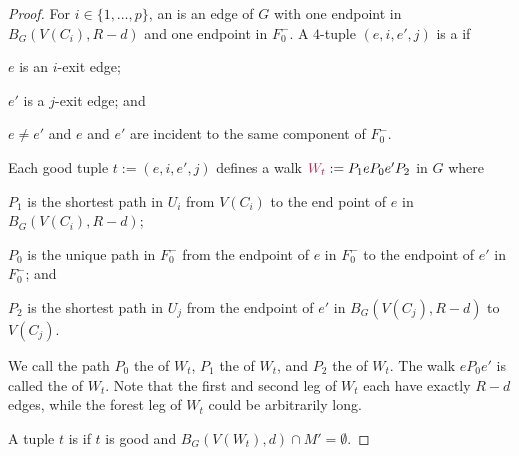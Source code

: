 \documentclass{patmorin}
\newcommand{\piotr}[1]{\textcolor{red}{Piotr: #1}}
\begin{document}
\begin{proof}
For $i\in\{1,\ldots,p\}$, an  is an edge of $G$ with one endpoint in $B_G(V(C_i),R-d)$ and one endpoint in $F_0^-$.
A $4$-tuple $(e,i,e',j)$ is a  if
\begin{compactitem}
  \item $e$ is an $i$-exit edge;
  \item $e'$ is a $j$-exit edge;
  and \item $e\neq e'$ and $e$ and $e'$ are incident to the same component of $F_0^-$.
\end{compactitem}
Each good tuple $t:=(e,i,e',j)$  defines a walk $\mathdefin{W_t}:=P_1eP_0e'P_2$ in $G$ where
\begin{compactitem}
  \item $P_1$ is the shortest path in $U_i$ from $V(C_i)$ to the end point of $e$ in $B_G(V(C_i),R-d)$;
  \item $P_0$ is the unique path in $F_0^-$ from the endpoint of $e$ in $F^-_0$ to the endpoint of $e'$ in $F^-_0$; and
  \item $P_2$ is the shortest path in $U_j$ from the endpoint of $e'$ in $B_G(V(C_j),R-d)$ to $V(C_j)$.
\end{compactitem}
We call the path $P_0$ the  of $W_t$, $P_1$ the  of $W_t$, and $P_2$ the  of $W_t$.  The walk $eP_0e'$ is called the  of $W_t$.  Note that the first and second leg of $W_t$ each have exactly $R-d$ edges, while the forest leg of $W_t$ could be arbitrarily long.

A tuple $t$ is  if $t$ is good and $B_G(V(W_t),d) \cap M' = \emptyset$.




\end{proof}
\end{document}
